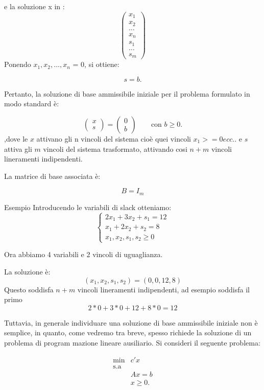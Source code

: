 e la soluzione x in :
\[
\begin{pmatrix}
    x_1 \\ x_2 \\ \dots \\ x_n \\ s_1 \\ \dots \\ s_m
\end{pmatrix}
\]
Ponendo $x_1,x_2,\dots,x_n$ = 0, si ottiene:

\[
s=b.
\]

Pertanto, la soluzione di base ammissibile iniziale per il problema formulato in modo standard è:

\[
\boxed{
\begin{pmatrix}x\\s\end{pmatrix}
=
\begin{pmatrix}0\\b\end{pmatrix}
}
\qquad \text{con } b\geq 0.
\]
,dove le $x$ attivano gli n vincoli del sistema cioè quei vincoli $x_1 >=0 ecc..$ e $s$ attiva gli $m$ vincoli del sistema trasformato, attivando cosi $n + m$ vincoli lineramenti indipendenti.

La matrice di base associata è:

\[
\boxed{B=I_m}
\]

\begin{example}{Esempio}
Introducendo le variabili di slack otteniamo:
\[
\begin{cases}
2x_1+3x_2+s_1=12\\
x_1+2x_2+s_2=8\\
x_1,x_2,s_1,s_2\geq0
\end{cases}
\]

Ora abbiamo 4 variabili e 2 vincoli di uguaglianza.

La soluzione è:
\[
\boxed{(x_1,x_2,s_1,s_2)=(0,0,12,8)}
\]
Questo soddisfa $n + m$ vincoli lineramenti indipendenti, ad esempio soddisfa il primo $$
2*0 + 3 * 0 + 12 + 8 * 0 = 12 
$$
\end{example}
Tuttavia, in generale individuare una soluzione di base ammissibile iniziale non è semplice, in quanto, come
vedremo tra breve, spesso richiede la soluzione di un problema di program
mazione lineare ausiliario.
Si consideri il seguente problema:

\[
\begin{array}{ll}
\min & c'x \\
\text{s.a} & \\
& Ax = b \\
& x \ge 0.
\end{array}
\]

